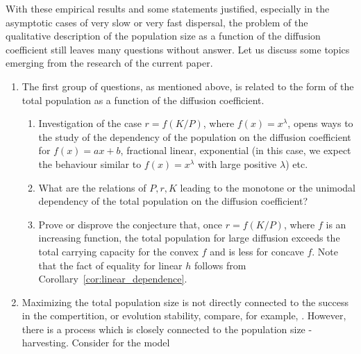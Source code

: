 \documentclass[11pt]{article}
\theoremstyle{definition}
\theoremstyle{remark}
\begin{document}
With these empirical results and some statements justified, especially in the asymptotic cases of very slow or very fast dispersal, the problem
of the qualitative description of the population size as a function of the diffusion coefficient still leaves many questions without answer.
Let us discuss some topics emerging from the research of the current paper.

\begin{enumerate}
\item
The first group of questions, as mentioned above, is related to the form of the total population as a function of the diffusion coefficient. 
\begin{enumerate}
\item
Investigation of the case $r=f (K/P)$, where $f(x)=x^{\lambda}$, opens ways to the study of the dependency of the population on the diffusion coefficient for
$f(x)=ax+b$, fractional linear, exponential (in this case, we expect the behaviour similar to  $f(x)=x^{\lambda}$ with large positive $\lambda$) etc. 
\item
What are the relations of $P,r,K$ leading to the monotone or the unimodal dependency of the total population on the diffusion coefficient?
\item
Prove or disprove the conjecture that, once $r=f(K/P)$, where $f$ is an increasing function, the total population for large diffusion exceeds the total carrying capacity for 
the convex $f$ and is less for concave $f$. Note that the fact of equality for linear $h$  follows from Corollary~\ref{cor:linear_dependence}.
\end{enumerate}
\item
Maximizing the total population size is not directly connected to the success in the compertition, or evolution stability, compare, for example, \cite{CCBook,Korobenko2012,Korobenko2014,Lou}.
However, there is a process which is closely connected to the population size - harvesting. Consider for the model

\end{enumerate}
\end{document}
